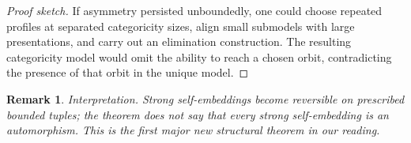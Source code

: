 \documentclass[11pt]{article}
\theoremstyle{plain}
\newtheorem{remark}[definition]{Remark}
\begin{document}
\begin{proof}[Proof sketch]If asymmetry persisted unboundedly, one could choose repeated profiles at separated categoricity sizes, align small submodels with large presentations, and carry out an elimination construction. The resulting categoricity model would omit the ability to reach a chosen orbit, contradicting the presence of that orbit in the unique model.
\end{proof}

\begin{remark}
\emph{Interpretation.} Strong self-embeddings become reversible \emph{on prescribed bounded tuples}; the theorem does not say that every strong self-embedding is an automorphism. This is the first major new structural theorem in our reading.
\end{remark}
\end{document}
